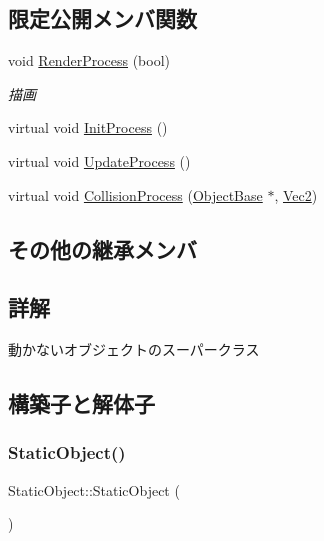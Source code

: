 \subsection*{限定公開メンバ関数}
\begin{DoxyCompactItemize}
\item 
void \mbox{\hyperlink{class_static_object_afec57009537695c4715386120a619942}{Render\+Process}} (bool)
\begin{DoxyCompactList}\small\item\em 描画 \end{DoxyCompactList}\item 
virtual void \mbox{\hyperlink{class_static_object_afa0709f50495338a23c1140062a567af}{Init\+Process}} ()
\item 
virtual void \mbox{\hyperlink{class_static_object_a7fa678c3c4032bb6e9417f93a8bb895c}{Update\+Process}} ()
\item 
virtual void \mbox{\hyperlink{class_static_object_a36379eb74b66c1586f1cc678a85c52c1}{Collision\+Process}} (\mbox{\hyperlink{class_object_base}{Object\+Base}} $\ast$, \mbox{\hyperlink{common_8h_ae148fff5818e9444b4ab2288829559bf}{Vec2}})
\end{DoxyCompactItemize}
\subsection*{その他の継承メンバ}


\subsection{詳解}
動かないオブジェクトのスーパークラス 

\subsection{構築子と解体子}
\mbox{\label{class_static_object_a2a8e918ddfe5c6723b88b9f5c4156472}} 
\subsubsection{\texorpdfstring{Static\+Object()}{StaticObject()}\hspace{0.1cm}{\footnotesize\ttfamily [1/2]}}
{\footnotesize\ttfamily Static\+Object\+::\+Static\+Object (\begin{DoxyParamCaption}{ }\end{DoxyParamCaption})\hspace{0.3cm}{\ttfamily [inline]}}



